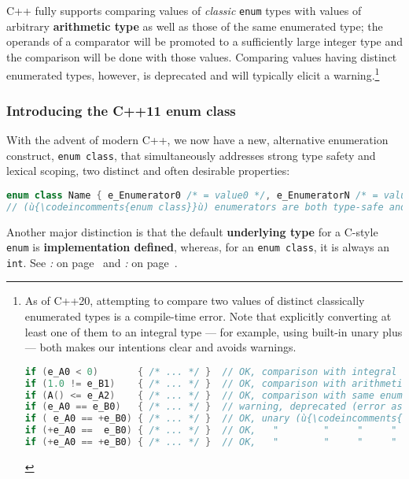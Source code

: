 C++ fully supports comparing values of \emph{classic} \texttt{enum}
types with values of arbitrary \textbf{arithmetic type} as well as those
of the same enumerated type; the operands of a comparator will be
promoted to a sufficiently large integer type and the comparison will be
done with those values. Comparing values having distinct enumerated
types, however, is deprecated and will typically elicit a
warning.{\cprotect\footnote{As of C++20, attempting to compare two values of distinct classically enumerated
types is a compile-time error. Note that explicitly converting at least one of them to an
integral type --- for example, using built-in unary plus --- both
makes our intentions clear and avoids warnings.

\begin{lstlisting}[language=C++, basicstyle={\ttfamily\footnotesize}]
if (e_A0 < 0)       { /* ... */ }  // OK, comparison with integral type
if (1.0 != e_B1)    { /* ... */ }  // OK, comparison with arithmetic type
if (A() <= e_A2)    { /* ... */ }  // OK, comparison with same enumerated type
if (e_A0 == e_B0)   { /* ... */ }  // warning, deprecated (error as of C++20)
if ( e_A0 == +e_B0) { /* ... */ }  // OK, unary (ù{\codeincomments{+}}ù) converts to integral type
if (+e_A0 ==  e_B0) { /* ... */ }  // OK,   "        "     "     "      "
if (+e_A0 == +e_B0) { /* ... */ }  // OK,   "        "     "     "      "
\end{lstlisting}
}}

\subsubsection[Introducing the C++11 {\tt enum class}]{Introducing the C++11 {\SubsubsecCode enum class}}\label{introducing-the-c++11-enum-class}

With the advent of modern C++, we now have a new, alternative
enumeration construct, \texttt{enum}~\texttt{class}, that simultaneously
addresses strong type safety and lexical scoping, two distinct and often
desirable properties:

\begin{lstlisting}[language=C++]
enum class Name { e_Enumerator0 /* = value0 */, e_EnumeratorN /* = valueN */ };
// (ù{\codeincomments{enum class}}ù) enumerators are both type-safe and scoped
\end{lstlisting}

\noindent Another major distinction is that the default
\textbf{underlying type} for a C-style \texttt{enum} is
\textbf{implementation defined}, whereas, for an
\texttt{enum}~\texttt{class}, it is always an \texttt{int}. See
\textit{: } on page~\pageref{enum-class-and-underlying-type} and
\textit{: } on page~\pageref{external-use-of-opaque-enumerators}.

